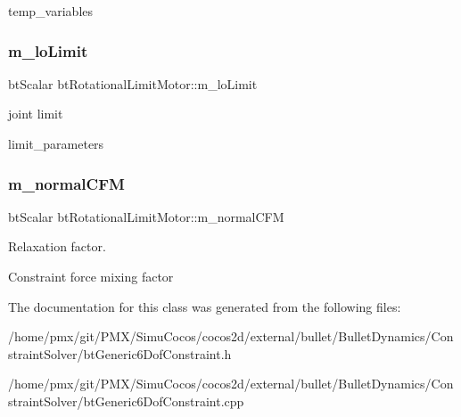 temp\+\_\+variables \mbox{\label{classbtRotationalLimitMotor_a57ff414e1856d661d81b797702c4f986}} 
\subsubsection{\texorpdfstring{m\+\_\+lo\+Limit}{m\_loLimit}}
{\footnotesize\ttfamily bt\+Scalar bt\+Rotational\+Limit\+Motor\+::m\+\_\+lo\+Limit}



joint limit 

limit\+\_\+parameters \mbox{\label{classbtRotationalLimitMotor_a3d06f5a5de013fd97f39cf63273dce45}} 
\subsubsection{\texorpdfstring{m\+\_\+normal\+C\+FM}{m\_normalCFM}}
{\footnotesize\ttfamily bt\+Scalar bt\+Rotational\+Limit\+Motor\+::m\+\_\+normal\+C\+FM}



Relaxation factor. 

Constraint force mixing factor 

The documentation for this class was generated from the following files\+:\begin{DoxyCompactItemize}
\item 
/home/pmx/git/\+P\+M\+X/\+Simu\+Cocos/cocos2d/external/bullet/\+Bullet\+Dynamics/\+Constraint\+Solver/bt\+Generic6\+Dof\+Constraint.\+h\item 
/home/pmx/git/\+P\+M\+X/\+Simu\+Cocos/cocos2d/external/bullet/\+Bullet\+Dynamics/\+Constraint\+Solver/bt\+Generic6\+Dof\+Constraint.\+cpp\end{DoxyCompactItemize}
